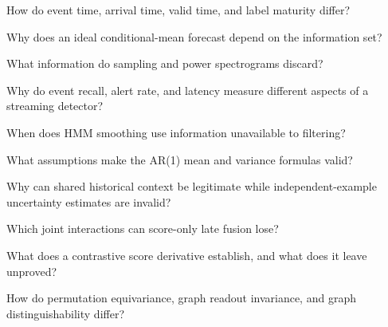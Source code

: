 \begin{studyquestions}
\item How do event time, arrival time, valid time, and label maturity differ?
\item Why does an ideal conditional-mean forecast depend on the information set?
\item What information do sampling and power spectrograms discard?
\item Why do event recall, alert rate, and latency measure different aspects of a streaming detector?
\item When does HMM smoothing use information unavailable to filtering?
\item What assumptions make the AR(1) mean and variance formulas valid?
\item Why can shared historical context be legitimate while independent-example uncertainty estimates are invalid?
\item Which joint interactions can score-only late fusion lose?
\item What does a contrastive score derivative establish, and what does it leave unproved?
\item How do permutation equivariance, graph readout invariance, and graph distinguishability differ?
\end{studyquestions}

